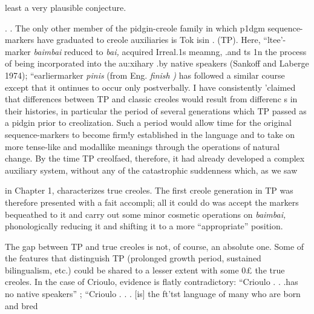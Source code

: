 least a very plausible conjecture.

. . The only other member of the pidgin-creole family in which p1dgm sequence-markers have graduated to creole auxiliaries is Tok isin . (TP). Here, ``ltee'-marker \textit{baimbai }reduced to \textit{bai, }acquired Irreal.1s meamng, .and ts 1n the process of being incorporated into the au:xihary .by native speakers (Sankoff and Laberge 1974); ``earlier{\textquotedbl}\-marker \textit{pinis} (from Eng. \textit{finish} \textit{)} has followed a similar course except that it ontinues to occur only postverbally. I have consistently 'claimed that differences between TP and classic creoles would result from differenc s in their histories, in particular the period of several genera\-tions which TP passed as a pidgin prior to creolization. Such a period would allow time for the original sequence-markers to become firm!y established in the language and to take on more tense-like and modal\-like meanings through the operations of natural change. By the time TP creolfaed, therefore, it had already developed a complex auxiliary system, without any of the catastrophic suddenness which, as we saw


in Chapter 1, characterizes true creoles. The first creole generation in TP was therefore presented with a fait accompli; all it could do was accept the markers bequeathed to it and carry out some minor cosmetic operations on \textit{baimbai,} phonologically reducing it and shifting it to a more ``appropriate'' position.

The gap between TP and true creoles is not, of course, an abso\-lute one. Some of the features that distinguish TP (prolonged growth period, sustained bilingualism, etc.) could be shared to a lesser extent with some 0£ the true creoles. In the case of Crioulo, evidence is flatly contradictory: ``Crioulo . . .has no native speakers'' \citep{Alleyne1979}; ``Crioulo . . . [is] the ft'tst language of many who are born and bred

